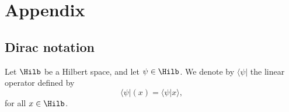 \chapter*{Appendix}

\section*{Dirac notation}

Let $\Hilb$ be a Hilbert space, and let $\psi \in \Hilb$. We denote by $\langle \psi |$ the linear operator defined by
\[
\langle \psi | (x) = \langle \psi | x \rangle ,
\]
for all $x \in \Hilb$.
